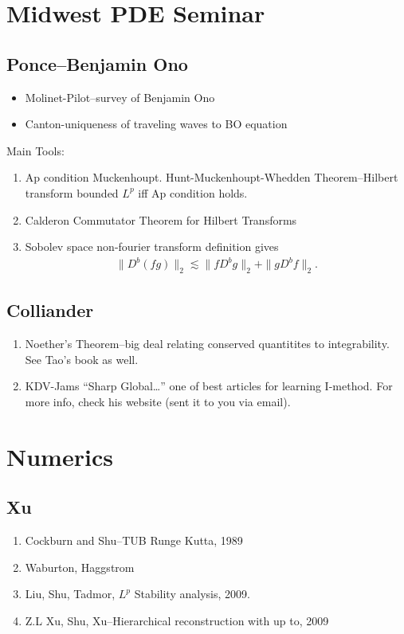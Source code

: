 \documentclass[12pt,reqno]{amsart}
\numberwithin{equation}{section}  %
\begin{document}
\section{Midwest PDE Seminar} 
\label{sec:mpde}
\subsection{Ponce--Benjamin Ono} 
\label{ssec:ponce-benono}
\begin{itemize}
    \item{}
	Molinet-Pilot--survey of Benjamin Ono
    \item{}
	Canton-uniqueness of traveling waves to BO equation
\end{itemize}
Main Tools:
\begin{enumerate}
    \item{}
	Ap condition Muckenhoupt. Hunt-Muckenhoupt-Whedden Theorem--Hilbert transform bounded $L^{p}$ iff Ap condition holds.
    \item{}
	Calderon Commutator Theorem for Hilbert Transforms
    \item{}
	Sobolev space non-fourier transform definition gives
	\begin{equation*}
	    \begin{split}
		\| D^{b}(fg) \|_{2} \lesssim \| fD^{b}g \|_{2} + \| gD^{b}f \|_{2}.
	    \end{split}
	\end{equation*}
\end{enumerate}
%
%
\subsection{Colliander} 
\label{ssec:col-web}
\begin{enumerate}
    \item{} Noether's Theorem--big deal relating conserved quantitites to integrability. See Tao's book as well.
    \item{} KDV-Jams ``Sharp Global\ldots'' one of best articles for learning I-method. For more info, check his website (sent it to you via email).
\end{enumerate}
%
%
%
%
%
%
%
%
\section{Numerics} 
\label{sec:numerics}
\subsection{Xu} 
\begin{enumerate}
    \item{}
	Cockburn and Shu--TUB Runge Kutta, 1989
    \item{}
	Waburton, Haggstrom
    \item{}
	Liu, Shu, Tadmor, $L^{p}$ Stability analysis, 2009.
    \item{}
	Z.L Xu, Shu, Xu--Hierarchical reconstruction with up to, 2009
\end{enumerate}
\end{document}
